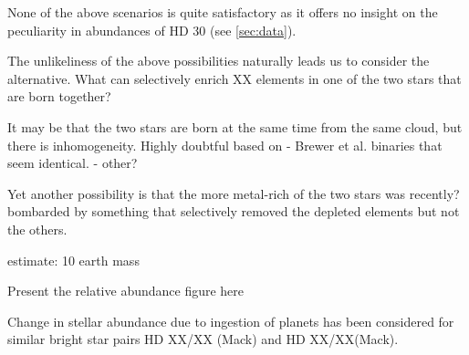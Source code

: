 \documentclass[manuscript]{aastex6}
\begin{document}
None of the above scenarios is quite satisfactory as it offers no
insight on the peculiarity in abundances of HD 30 (see \ref{sec:data}).

The unlikeliness of the above possibilities naturally leads us to
consider the alternative.
What can selectively enrich XX elements in one of the two stars that are born together?

It may be that the two stars are born at the same time from the same cloud, but
there is inhomogeneity. Highly doubtful based on
- Brewer et al. binaries that seem identical.
- other?

Yet another possibility is that the more metal-rich of the two stars
was recently? bombarded by something that selectively removed the depleted elements but not the others.

estimate: 10 earth mass

Present the relative abundance figure here

Change in stellar abundance due to ingestion of planets has been considered
for similar bright star pairs HD XX/XX (Mack) and HD XX/XX(Mack).





\end{document}
